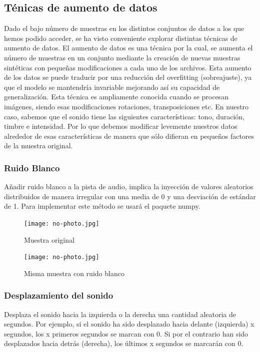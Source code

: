 \documentclass[11pt,a4paper,spanish]{book}
\begin{document}
	
	\subsection{Ténicas de aumento de datos}
	Dado el bajo número de muestras en los distintos conjuntos de datos a los que hemos podido acceder, se ha visto conveniente explorar distintas técnicas de aumento de datos. El aumento de datos es una técnica por la cual, se aumenta el número de muestras en un conjunto mediante la creación de nuevas muestras sintéticas con pequeñas modificaciones a cada uno de los archivos. Esta aumento de los datos se puede traducir por una reducción del overfitting (sobreajuste), ya que el modelo se mantendría invariable mejorando así su capacidad de generalización.
	Esta técnica es ampliamente conocida cuando se procesan imágenes, siendo esas modificaciones rotaciones, transposiciones etc. En nuestro caso, sabemos que el sonido tiene las siguientes características: tono, duración, timbre e intensidad. Por lo que debemos modificar levemente nuestros datos alrededor de esas características de manera que sólo difieran en pequeños factores de la muestra original.
	
		\subsubsection{Ruido Blanco}
		Añadir ruido blanco a la pista de audio, implica la inyección de valores aleatorios distribuidos de manera irregular con una media de 0 y una desviación de estándar de 1. Para implementar este método se usará el paquete numpy.
		
		\begin{figure}[!htb]
			\begin{minipage}{0.45\textwidth}
				\centering
				\texttt{[image: no-photo.jpg]}
				\caption{Muestra original}
				\label{ref:audio_original_1}
			\end{minipage}\hfill 
			\begin{minipage}{0.45\textwidth}
				\centering
				\texttt{[image: no-photo.jpg]}\hfill
				\caption{Misma muestra con ruido blanco}
				\label{ref:audio_wn}
			\end{minipage}
		\end{figure}
				
				
		\subsubsection{Desplazamiento del sonido}
		Desplaza el sonido hacia la izquierda o la derecha una cantidad aleatoria de segundos. Por ejemplo, si el sonido ha sido desplazado hacia delante (izquierda) x segundos, los x primeros segundos se marcan con 0. Si por el contrario han sido desplazados hacia detrás (derecha), los últimos x segundos se marcarán con 0.
		
\end{document}
